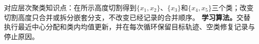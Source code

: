 \documentclass[UTF8,a4paper,11pt,openany]{ctexbook}
\begin{document}
\setcounter{page}{564}
\setcounter{chapter}{25}
\setcounter{figure}{0}
\pagestyle{headings}

对应层次聚类知识点：在所示高度切割得到$\{x_1,x_2\}$、$\{x_3\}$和$\{x_4,x_5\}$三个类；改变切割高度只合并或拆分嵌套分支，不改变已经记录的合并顺序。
\textbf{学习算法。}\kMeans{}交替执行最近中心分配和类内均值更新，并在每次循环保留目标轨迹、空类修复记录与停止原因。
\end{document}
